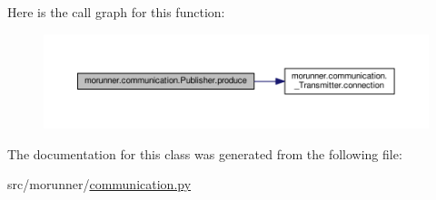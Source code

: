 Here is the call graph for this function\+:
\nopagebreak
\begin{figure}[H]
\begin{center}
\leavevmode
\includegraphics[width=350pt]{classmorunner_1_1communication_1_1Publisher_a31e6bd7d0f60bfde37c026ddd55ff8b6_cgraph}
\end{center}
\end{figure}




The documentation for this class was generated from the following file\+:\begin{DoxyCompactItemize}
\item 
src/morunner/\hyperlink{communication_8py}{communication.\+py}\end{DoxyCompactItemize}
